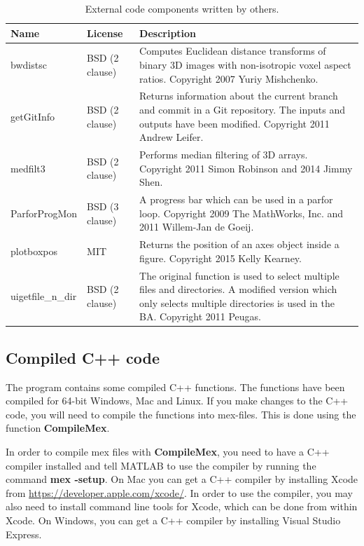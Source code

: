 \documentclass[a4paper, oneside, onecolumn, 11pt]{article}
\newcommand{\command}[1]{\textbf{#1}}
\begin{document}
\begin{table}[!htbp]
\caption{External code components written by others.}
\label{tab:external}
\begin{tabularx}{\textwidth}{llX}
Name & License & Description\\
\hline
bwdistsc & BSD (2 clause) & Computes Euclidean distance transforms of binary 3D images with non-isotropic voxel aspect ratios. Copyright 2007 Yuriy Mishchenko.\\
getGitInfo & BSD (2 clause)  & Returns information about the current branch and commit in a Git repository. The inputs and outputs have been modified.  Copyright 2011 Andrew Leifer.\\
medfilt3 & BSD (2 clause) & Performs median filtering of 3D arrays. Copyright 2011 Simon Robinson and 2014 Jimmy Shen.\\
ParforProgMon & BSD (3 clause) & A progress bar which can be used in a parfor loop. Copyright 2009 The MathWorks, Inc. and 2011 Willem-Jan de Goeij.\\
plotboxpos & MIT & Returns the position of an axes object inside a figure. Copyright 2015 Kelly Kearney.\\
uigetfile\_n\_dir & BSD (2 clause) & The original function is used to select multiple files and directories. A modified version which only selects multiple directories is used in the BA. Copyright 2011 Peugas.\\
\end{tabularx}
\end{table}

\subsection{Compiled C++ code}
\label{sec:compile}
The program contains some compiled C++ functions. The functions have been compiled for 64-bit Windows, Mac and Linux. If you make changes to the C++ code, you will need to compile the functions into mex-files. This is done using the function \command{CompileMex}.

In order to compile mex files with \command{CompileMex}, you need to have a C++ compiler installed and tell MATLAB to use the compiler by running the command \command{mex -setup}. On Mac you can get a C++ compiler by installing Xcode from \url{https://developer.apple.com/xcode/}. In order to use the compiler, you may also need to install command line tools for Xcode, which can be done from within Xcode. On Windows, you can get a C++ compiler by installing Visual Studio Express.
\end{document}
